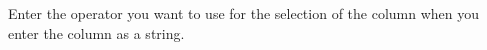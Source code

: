 

Enter the operator you want to use for the selection of the column when you enter the column as a string.

